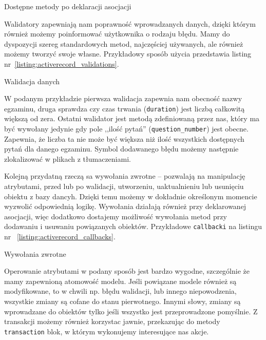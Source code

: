 \documentclass[a4paper,12pt]{article}
\begin{document}
\begin{listing}
  
  \caption{Dostępne metody po deklaracji asocjacji}
  \label{listing:activerecord_association_finders}
\end{listing}


Walidatory zapewniają nam poprawność wprowadzanych danych, dzięki którym również
możemy poinformować użytkownika o rodzaju błędu. Mamy do dyspozycji szereg
standardowych metod, najczęściej używanych, ale również możemy tworzyć swoje
własne. Przykładowy sposób użycia przedstawia listing
nr~\ref{listing:activerecord_validations}.

\begin{listing}
  
  \caption{Walidacja danych}
  \label{listing:activerecord_validations}
\end{listing}


W podanym przykładzie pierwsza walidacja zapewnia nam obecność nazwy egzaminu,
druga sprawdza czy czas trwania (\texttt{duration}) jest liczbą całkowitą większą od
zera. Ostatni walidator jest metodą zdefiniowaną przez nas, który ma być
wywołany jedynie gdy pole ,,ilość pytań'' (\texttt{question\_number}) jest obecne.
Zapewnia, że liczba ta nie może być większa niż ilość wszystkich dostępnych
pytań dla danego egzaminu. Symbol dodawanego błędu możemy następnie zlokalizować
w plikach z tłumaczeniami.


Kolejną przydatną rzeczą sa wywołania zwrotne -- pozwalają na manipulację
atrybutami, przed lub po walidacji, utworzeniu, uaktualnieniu lub usunięciu
obiektu z bazy dancyh. Dzięki temu możemy w dokładnie określonym momencie
wyzwolić odpowiednią logikę. Wywołania działają również przy deklarowanej
asocjacji, więc dodatkowo dostajemy możliwość wywołania metod przy dodawaniu i
usuwaniu powiązanych obiektów. Przykładowe \texttt{callbacki} na listingu nr~
\ref{listing:activerecord_callbacks}.

\begin{listing}
  
  \caption{Wywołania zwrotne}
  \label{listing:activerecord_callbacks}
\end{listing}


Operowanie atrybutami w podany sposób jest bardzo wygodne, szczególnie że mamy
zapewnioną atomowość modelu. Jeśli powiązane modele również są modyfikowane, to
w chwili np. błędu walidacji, lub innego niepowodzenia, wszystkie zmiany są
cofane do stanu pierwotnego. Innymi słowy, zmiany są wprowadzane do obiektów
tylko jeśli wszystko jest przeprowadzone pomyślnie. Z transakcji możemy również
korzystac jawnie, przekazując do metody \texttt{transaction} blok, w którym
wykonujemy interesujące nas akcje.
\end{document}
